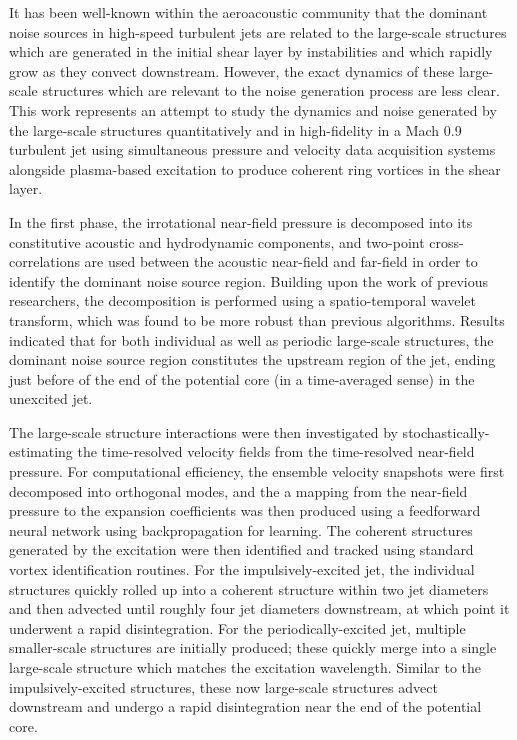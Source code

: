 It has been well-known within the aeroacoustic community that the dominant noise sources in high-speed turbulent jets are related to the large-scale structures which are generated in the initial shear layer by instabilities and which rapidly grow as they convect downstream.
However, the exact dynamics of these large-scale structures which are relevant to the noise generation process are less clear.
This work represents an attempt to study the dynamics and noise generated by the large-scale structures quantitatively and in high-fidelity in a Mach 0.9 turbulent jet using simultaneous pressure and velocity data acquisition systems alongside plasma-based excitation to produce coherent ring vortices in the shear layer.

In the first phase, the irrotational near-field pressure is decomposed into its constitutive acoustic and hydrodynamic components, and two-point cross-correlations are used between the acoustic near-field and far-field in order to identify the dominant noise source region.
Building upon the work of previous researchers, the decomposition is performed using a spatio-temporal wavelet transform, which was found to be more robust than previous algorithms.
Results indicated that for both individual as well as periodic large-scale structures, the dominant noise source region constitutes the upstream region of the jet, ending just before of the end of the potential core (in a time-averaged sense) in the unexcited jet.

The large-scale structure interactions were then investigated by stochastically-estimating the time-resolved velocity fields from the time-resolved near-field pressure.
For computational efficiency, the ensemble velocity snapshots were first decomposed into orthogonal modes, and the a mapping from the near-field pressure to the expansion coefficients was then produced using a feedforward neural network using backpropagation for learning.
The coherent structures generated by the excitation were then identified and tracked using standard vortex identification routines.
For the impulsively-excited jet, the individual structures quickly rolled up into a coherent structure within two jet diameters and then advected until roughly four jet diameters downstream, at which point it underwent a rapid disintegration.
For the periodically-excited jet, multiple smaller-scale structures are initially produced; these quickly merge into a single large-scale structure which matches the excitation wavelength.
Similar to the impulsively-excited structures, these now large-scale structures advect downstream and undergo a rapid disintegration near the end of the potential core. 

